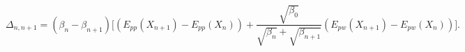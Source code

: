 \begin{center}
    \begin{equation}
        \Delta_{n,n+1} = (\beta_{n} - \beta_{n+1}) \Big[(E_{pp}(X_{n+1}) - E_{pp}(X_{n})) + \frac{\sqrt{\beta_{0}}} {\sqrt{\beta_{n}}+\sqrt{\beta_{n+1}}} (E_{pw}(X_{n+1}) - E_{pw}(X_{n}))\Big].
        \label{eq:rest2_AR}
    \end{equation}
\end{center}
